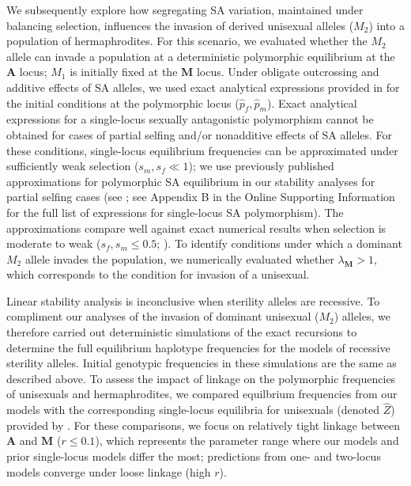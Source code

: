 \documentclass{article}
\begin{document}
We subsequently explore how segregating SA variation, maintained under balancing selection, influences the invasion of derived unisexual alleles ($M_2$) into a population of hermaphrodites. For this scenario, we evaluated whether the $M_2$ allele can invade a population at a deterministic polymorphic equilibrium at the $\mathbf{A}$ locus; $M_1$ is initially fixed at the $\mathbf{M}$ locus. Under obligate outcrossing and additive effects of SA alleles, we used exact analytical expressions provided in \citet{Kidwell1977} for the initial conditions at the polymorphic locus ($\hat{p}_f,\hat{p}_m$). Exact analytical expressions for a single-locus sexually antagonistic polymorphism cannot be obtained for cases of partial selfing and/or nonadditive effects of SA alleles. For these conditions, single-locus equilibrium frequencies can be approximated under sufficiently weak selection ($s_m,s_f \ll 1$); we use previously published approximations for polymorphic SA equilibrium in our stability analyses for partial selfing cases (see \citealt{JordanConnallon2014,ConnallonJordan2016}; see Appendix B in the Online Supporting Information  for the full list of expressions for single-locus SA polymorphism). The approximations compare well against exact numerical results when selection is moderate to weak ($s_f,s_m \leq 0.5$; \citealt{JordanConnallon2014, ConnallonJordan2016, Olito2016}). To identify conditions under which a dominant $M_2$ allele invades the population, we numerically evaluated whether $\lambda_{\mathbf{M}} > 1$, which corresponds to the condition for invasion of a unisexual.

Linear stability analysis is inconclusive when sterility alleles are recessive. To compliment our analyses of the invasion of dominant unisexual ($M_2$) alleles, we therefore carried out deterministic simulations of the exact recursions to determine the full equilibrium haplotype frequencies for the models of recessive sterility alleles. Initial genotypic frequencies in these simulations are the same as described above. To assess the impact of linkage on the polymorphic frequencies of unisexuals and hermaphrodites, we compared equilbrium frequencies from our models with the corresponding single-locus equilibria for unisexuals (denoted $\hat{Z}$) provided by \citet{Charlesworth1978a}. For these comparisons, we focus on relatively tight linkage between $\mathbf{A}$ and $\mathbf{M}$ ($r\leq 0.1$), which represents the parameter range where our models and prior single-locus models differ the most; predictions from one- and two-locus models converge under loose linkage (high $r$). 
\end{document}
